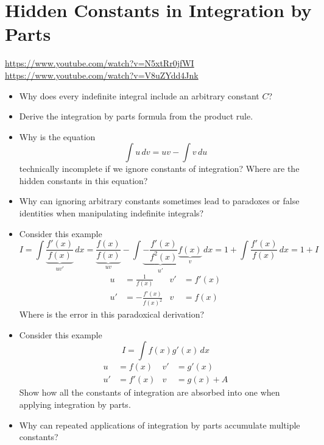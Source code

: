 \section{Hidden Constants in Integration by Parts}

\url{https://www.youtube.com/watch?v=N5xtRr0jfWI} \\
\url{https://www.youtube.com/watch?v=V8uZYdd4Jnk}

\begin{itemize}

\item Why does every indefinite integral include an arbitrary constant $C$?

\item Derive the integration by parts formula from the product rule.

\item Why is the equation
  \[
    \int u\,dv = uv - \int v\,du
  \]
  technically incomplete if we ignore constants of integration? Where are the hidden constants in this equation?

\item Why can ignoring arbitrary constants sometimes lead to paradoxes or false identities when manipulating indefinite integrals?

\item Consider this example
  \[
    I = \int \underbrace{\frac{f'(x)}{f(x)}}_{uv'} \, dx =
      \underbrace{\frac{f(x)}{f(x)}}_{uv} - \int \underbrace{-\frac{f'(x)}{f^2(x)}}_{u'} \underbrace{f(x)}_{v} \, dx =
      1 + \int \frac{f'(x)}{f(x)} \, dx =
      1 + I
  \]
  \begin{align*}
    u  &= \frac{1}{f(x)}        & v' &= f'(x) \\
    u' &= -\frac{f'(x)}{f(x)^2} & v  &= f(x)
  \end{align*}
  Where is the error in this paradoxical derivation?

\item Consider this example
  \[
    I = \int f(x)g'(x) \, dx
  \]
  \begin{align*}
    u  &= f(x)  & v' &= g'(x) \\
    u' &= f'(x) & v  &= g(x) + A
  \end{align*}
  Show how all the constants of integration are absorbed into one when applying integration by parts.

\item Why can repeated applications of integration by parts accumulate multiple constants?


\end{itemize}
